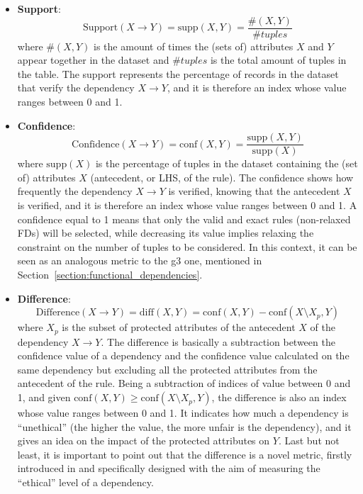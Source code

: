 \begin{itemize}
\item \textbf{Support}: \[\mathrm{Support}(X \rightarrow Y) = \mathrm{supp}(X, Y) = \frac{\#(X, Y)}{\mathit{\#tuples}}\] where \(\#(X, Y)\) is the amount of times the (sets of) attributes \(X\) and \(Y\) appear together in the dataset and \(\#tuples\) is the total amount of tuples in the table. The support represents the percentage of records in the dataset that verify the dependency \(X \rightarrow Y\), and it is therefore an index whose value ranges between 0 and 1.
\item \textbf{Confidence}: \[\mathrm{Confidence}(X \rightarrow Y) = \mathrm{conf}(X, Y) = \frac{\mathrm{supp}(X, Y)}{\mathrm{supp}(X)}\] where \(\mathrm{supp}(X)\) is the percentage of tuples in the dataset containing the (set of) attributes \(X\) (antecedent, or LHS, of the rule). The confidence shows how frequently the dependency \(X \rightarrow Y\) is verified, knowing that the antecedent \(X\) is verified, and it is therefore an index whose value ranges between 0 and 1. A confidence equal to 1 means that only the valid and exact rules (non-relaxed FDs) will be selected, while decreasing its value implies relaxing the constraint on the number of tuples to be considered. In this context, it can be seen as an analogous metric to the g3 one, mentioned in Section~\ref{section:functional_dependencies}.
\item \textbf{Difference}: \[\mathrm{Difference}(X \rightarrow Y) = \mathrm{diff}(X, Y) = \mathrm{conf}(X, Y) - \mathrm{conf}(X \setminus X_p, Y)\] where \(X_p\) is the subset of protected attributes of the antecedent \(X\) of the dependency \(X \rightarrow Y\). The difference is basically a subtraction between the confidence value of a dependency and the confidence value calculated on the same dependency but excluding all the protected attributes from the antecedent of the rule. Being a subtraction of indices of value between 0 and 1, and given \(\mathrm{conf}(X, Y) \geq \mathrm{conf}(X \setminus X_p, Y)\), the difference is also an index whose value ranges between 0 and 1. It indicates how much a dependency is ``unethical'' (the higher the value, the more unfair is the dependency), and it gives an idea on the impact of the protected attributes on \(Y\). Last but not least, it is important to point out that the difference is a novel metric, firstly introduced in \cite{azzalini2021fair} and specifically designed with the aim of measuring the ``ethical'' level of a dependency.
\end{itemize}


